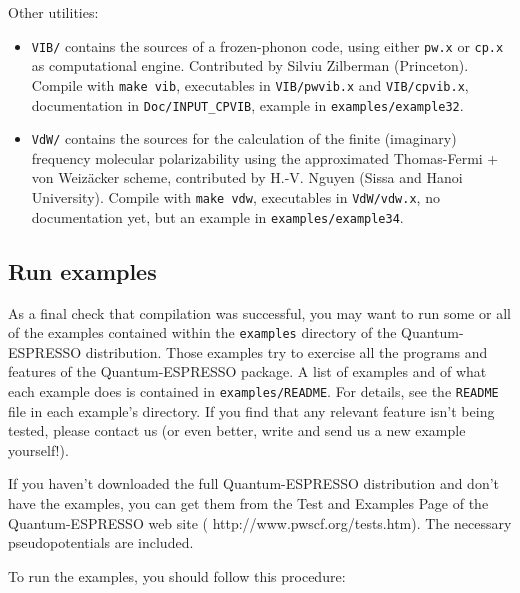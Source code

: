 \documentclass[12pt,a4paper]{article}
\begin{document}
Other utilities: 
\begin{itemize}
  \item \texttt{VIB/} contains the sources of a frozen-phonon code,
        using either \texttt{pw.x} or \texttt{cp.x} as computational
        engine. Contributed by Silviu Zilberman (Princeton). Compile with
        \texttt{make vib}, executables in \texttt{VIB/pwvib.x} and
        \texttt{VIB/cpvib.x}, documentation in \texttt{Doc/INPUT\_CPVIB}, 
        example in \texttt{examples/example32}.
  \item \texttt{VdW/} contains the sources  for the calculation of the 
        finite (imaginary) frequency molecular polarizability using the
        approximated Thomas-Fermi  + von Weiz\"acker scheme, contributed
        by H.-V. Nguyen (Sissa and Hanoi University). Compile with
        \texttt{make vdw}, executables in \texttt{VdW/vdw.x}, no
        documentation yet, but an example in \texttt{examples/example34}.
\end{itemize}

\subsection{Run examples}
  \label{runexamples}

As a final check that compilation was successful, you may want to run
some or all of the examples contained within the \texttt{examples}
directory of the Quantum-ESPRESSO distribution.
Those examples try to exercise all the programs and features of the
Quantum-ESPRESSO package. A list of examples and of what each example
does is contained in \texttt{examples/README}. For details, see the 
\texttt{README} file in each example's directory. 
If you find that any relevant feature isn't being tested, please
contact us (or even better, write and send us a new example
yourself!).

If you haven't downloaded the full Quantum-ESPRESSO distribution and don't
have the examples, you can get them from the Test and Examples Page of
the Quantum-ESPRESSO web site
(%
                   {http://www.pwscf.org/tests.htm}).
The necessary pseudopotentials are included.

To run the examples, you should follow this procedure:
\end{document}
